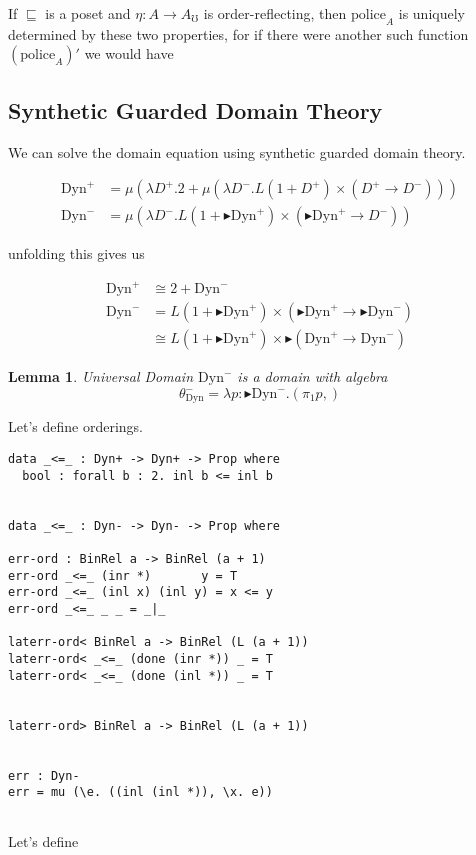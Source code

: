 \documentclass{article}
\newtheorem{lemma}{Lemma}[section]
\newcommand{\dynv}{\text{Dyn}^+}
\newcommand{\dync}{\text{Dyn}^-}
\newcommand{\police}[1]{\text{police}_{#1}}
\newcommand{\later}{{\blacktriangleright}}
\begin{document}
If $\sqsubseteq$ is a poset and $\eta : A \to A_\mho$ is order-reflecting,
then $\police A$ is uniquely determined by these two properties, for
if there were another such function $(\police A)'$ we would have
\[ \]

\subsection{Synthetic Guarded Domain Theory}

We can solve the domain equation using synthetic guarded domain
theory.

\begin{align*}
  \dynv &= \mu (\lambda D^+. 2 + \mu (\lambda D^-. L (1 + D^+) \times (D^+ \to D^-) ))\\
  \dync &= \mu (\lambda D^-. L (1 + \later \dynv) \times (\later \dynv \to D^-) )
\end{align*}

unfolding this gives us

\begin{align*}
  \dynv &\cong 2 + \dync \\
  \dync &= L (1 + \later \dynv) \times (\later \dynv \to \later \dync)\\
  &\cong L (1 + \later \dynv) \times \later (\dynv \to \dync)
\end{align*}

\begin{lemma}{Universal Domain}
  $\dync$ is a domain with algebra
  \[ \theta_\dync = \lambda p: \later \dync. (\pi_1p, ) \]
\end{lemma}

Let's define orderings.
\begin{verbatim}
data _<=_ : Dyn+ -> Dyn+ -> Prop where
  bool : forall b : 2. inl b <= inl b


data _<=_ : Dyn- -> Dyn- -> Prop where

err-ord : BinRel a -> BinRel (a + 1)
err-ord _<=_ (inr *)       y = T
err-ord _<=_ (inl x) (inl y) = x <= y
err-ord _<=_ _ _ = _|_

laterr-ord< BinRel a -> BinRel (L (a + 1))
laterr-ord< _<=_ (done (inr *)) _ = T
laterr-ord< _<=_ (done (inl *)) _ = T


laterr-ord> BinRel a -> BinRel (L (a + 1))
  

err : Dyn-
err = mu (\e. ((inl (inl *)), \x. e))


\end{verbatim}

Let's define
\end{document}
